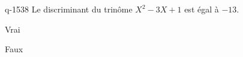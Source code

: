\begin{truefalse}{q-1538}
Le discriminant du trinôme $X^2-3X+1$ est égal à $-13$.
\item Vrai
\item* Faux
\end{truefalse}

